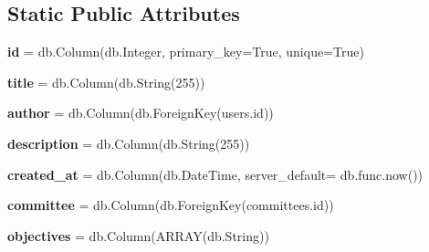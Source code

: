 \subsection*{Static Public Attributes}
\begin{DoxyCompactItemize}
\item 
\mbox{\label{classapp_1_1charges_1_1models_1_1_charges_af54c5389801c1e7324e70d0a7db11f8f}} 
{\bfseries id} = db.\+Column(db.\+Integer, primary\+\_\+key=True, unique=True)
\item 
\mbox{\label{classapp_1_1charges_1_1models_1_1_charges_ad8ff9ab21dbae0938197587fc91a3691}} 
{\bfseries title} = db.\+Column(db.\+String(255))
\item 
\mbox{\label{classapp_1_1charges_1_1models_1_1_charges_a3d780746fc539306a6b7e0e0f356817e}} 
{\bfseries author} = db.\+Column(db.\+Foreign\+Key(\textquotesingle{}users.\+id\textquotesingle{}))
\item 
\mbox{\label{classapp_1_1charges_1_1models_1_1_charges_a696c6a3c010790e2d1337280957c6c39}} 
{\bfseries description} = db.\+Column(db.\+String(255))
\item 
\mbox{\label{classapp_1_1charges_1_1models_1_1_charges_ab21d1af035df05a55e970114df4b8770}} 
{\bfseries created\+\_\+at} = db.\+Column(db.\+Date\+Time, server\+\_\+default= db.\+func.\+now())
\item 
\mbox{\label{classapp_1_1charges_1_1models_1_1_charges_adc62a6fe0f9cb978149336a372ac4b7a}} 
{\bfseries committee} = db.\+Column(db.\+Foreign\+Key(\textquotesingle{}committees.\+id\textquotesingle{}))
\item 
\mbox{\label{classapp_1_1charges_1_1models_1_1_charges_a45c59f4fe0b91b2cb598d24d0cfa72be}} 
{\bfseries objectives} = db.\+Column(A\+R\+R\+AY(db.\+String))
\item 
\mbox{\label{classapp_1_1charges_1_1models_1_1_charges_a51f84a59feeef986ef40e4e43d235aa6}} 

\end{DoxyCompactItemize}
